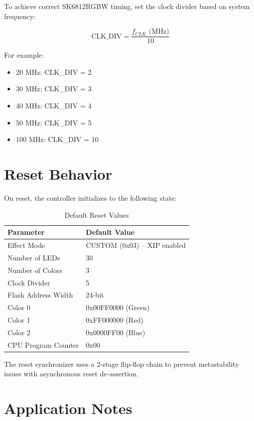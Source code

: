 \documentclass[11pt,a4paper]{article}
\begin{document}
To achieve correct SK6812RGBW timing, set the clock divider based on system frequency:

\[
\text{CLK\_DIV} = \frac{f_{CLK} \text{ (MHz)}}{10}
\]

For example:
\begin{itemize}[noitemsep]
    \item 20 MHz: CLK\_DIV = 2
    \item 30 MHz: CLK\_DIV = 3
    \item 40 MHz: CLK\_DIV = 4
    \item 50 MHz: CLK\_DIV = 5
    \item 100 MHz: CLK\_DIV = 10
\end{itemize}

\section{Reset Behavior}

On reset, the controller initializes to the following state:

\begin{table}[H]
\centering
\caption{Default Reset Values}
\begin{tabular}{@{}ll@{}}
\toprule
\textbf{Parameter} & \textbf{Default Value} \\
\midrule
Effect Mode & CUSTOM (0x03) -- XIP enabled \\
Number of LEDs & 30 \\
Number of Colors & 3 \\
Clock Divider & 5 \\
Flash Address Width & 24-bit \\
Color 0 & 0x00FF0000 (Green) \\
Color 1 & 0xFF000000 (Red) \\
Color 2 & 0x0000FF00 (Blue) \\
CPU Program Counter & 0x00 \\
\bottomrule
\end{tabular}
\end{table}

The reset synchronizer uses a 2-stage flip-flop chain to prevent metastability issues with asynchronous reset de-assertion.

\section{Application Notes}
\end{document}
